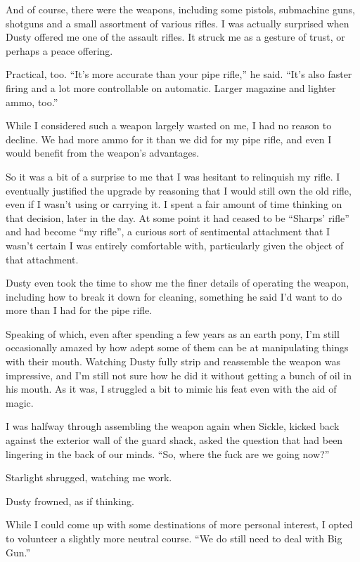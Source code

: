 And of course, there were the weapons, including some pistols, submachine guns, shotguns and a small assortment of various rifles. I was actually surprised when Dusty offered me one of the assault rifles. It struck me as a gesture of trust, or perhaps a peace offering.

Practical, too. “It’s more accurate than your pipe rifle,” he said. “It’s also faster firing and a lot more controllable on automatic. Larger magazine and lighter ammo, too.”

While I considered such a weapon largely wasted on me, I had no reason to decline. We had more ammo for it than we did for my pipe rifle, and even I would benefit from the weapon’s advantages.

So it was a bit of a surprise to me that I was hesitant to relinquish my rifle. I eventually justified the upgrade by reasoning that I would still own the old rifle, even if I wasn’t using or carrying it. I spent a fair amount of time thinking on that decision, later in the day. At some point it had ceased to be “Sharps’ rifle” and had become “my rifle”, a curious sort of sentimental attachment that I wasn’t certain I was entirely comfortable with, particularly given the object of that attachment.

Dusty even took the time to show me the finer details of operating the weapon, including how to break it down for cleaning, something he said I’d want to do more than I had for the pipe rifle.

Speaking of which, even after spending a few years as an earth pony, I’m still occasionally amazed by how adept some of them can be at manipulating things with their mouth. Watching Dusty fully strip and reassemble the weapon was impressive, and I’m still not sure how he did it without getting a bunch of oil in his mouth. As it was, I struggled a bit to mimic his feat even with the aid of magic.

I was halfway through assembling the weapon again when Sickle, kicked back against the exterior wall of the guard shack, asked the question that had been lingering in the back of our minds. “So, where the fuck are we going now?”

Starlight shrugged, watching me work.

Dusty frowned, as if thinking.

While I could come up with some destinations of more personal interest, I opted to volunteer a slightly more neutral course. “We do still need to deal with Big Gun.”

